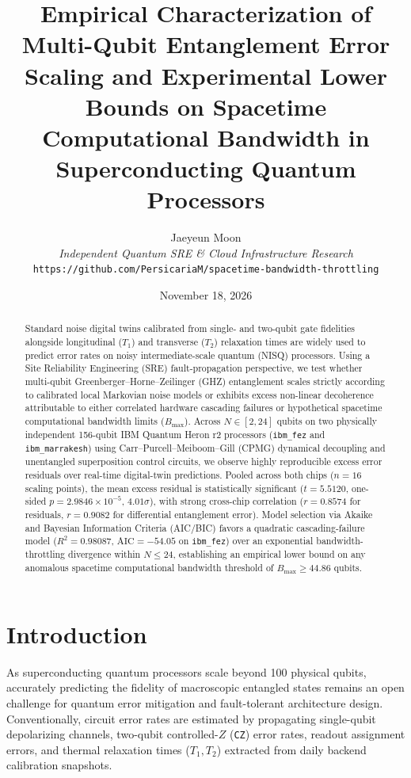 \documentclass[11pt,a4paper,twocolumn]{article}
\title{\textbf{Empirical Characterization of Multi-Qubit Entanglement Error Scaling and Experimental Lower Bounds on Spacetime Computational Bandwidth in Superconducting Quantum Processors}}
\author{
    Jaeyeun Moon\\
    \textit{Independent Quantum SRE \& Cloud Infrastructure Research}\\
    \texttt{https://github.com/PersicariaM/spacetime-bandwidth-throttling}
}
\date{November 18, 2026}
\begin{document}
\maketitle

\begin{abstract}
Standard noise digital twins calibrated from single- and two-qubit gate fidelities alongside longitudinal ($T_1$) and transverse ($T_2$) relaxation times are widely used to predict error rates on noisy intermediate-scale quantum (NISQ) processors. Using a Site Reliability Engineering (SRE) fault-propagation perspective, we test whether multi-qubit Greenberger--Horne--Zeilinger (GHZ) entanglement scales strictly according to calibrated local Markovian noise models or exhibits excess non-linear decoherence attributable to either correlated hardware cascading failures or hypothetical spacetime computational bandwidth limits ($B_{\max}$). Across $N \in [2, 24]$ qubits on two physically independent 156-qubit IBM Quantum Heron r2 processors (\texttt{ibm\_fez} and \texttt{ibm\_marrakesh}) using Carr--Purcell--Meiboom--Gill (CPMG) dynamical decoupling and unentangled superposition control circuits, we observe highly reproducible excess error residuals over real-time digital-twin predictions. Pooled across both chips ($n=16$ scaling points), the mean excess residual is statistically significant ($t = 5.5120$, one-sided $p = 2.9846 \times 10^{-5}$, $4.01\sigma$), with strong cross-chip correlation ($r = 0.8574$ for residuals, $r = 0.9082$ for differential entanglement error). Model selection via Akaike and Bayesian Information Criteria (AIC/BIC) favors a quadratic cascading-failure model ($R^2 = 0.98087$, $\text{AIC} = -54.05$ on \texttt{ibm\_fez}) over an exponential bandwidth-throttling divergence within $N \le 24$, establishing an empirical lower bound on any anomalous spacetime computational bandwidth threshold of $B_{\max} \ge 44.86\text{ qubits}$.
\end{abstract}

\section{Introduction}
As superconducting quantum processors scale beyond 100 physical qubits, accurately predicting the fidelity of macroscopic entangled states remains an open challenge for quantum error mitigation and fault-tolerant architecture design. Conventionally, circuit error rates are estimated by propagating single-qubit depolarizing channels, two-qubit controlled-$Z$ (\texttt{CZ}) error rates, readout assignment errors, and thermal relaxation times ($T_1, T_2$) extracted from daily backend calibration snapshots.
\end{document}
